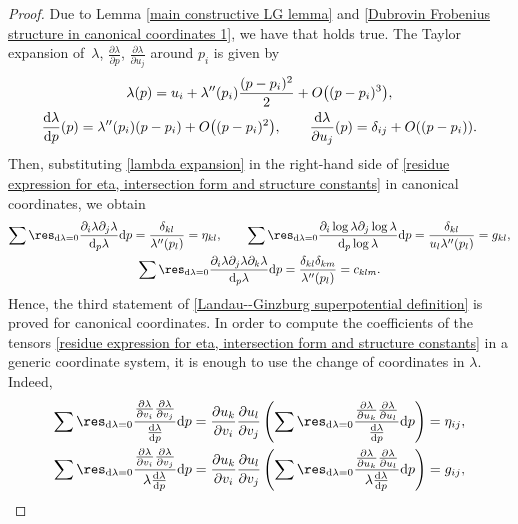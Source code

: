 \begin{proof}
Due to Lemma \ref{main constructive LG lemma} and \eqref{Dubrovin Frobenius structure in canonical coordinates 1}, we have that
holds true. The Taylor expansion of~$\lambda$, $\frac{\partial \lambda}{\partial p}$, $\frac{\partial \lambda}{\partial u_j}$ around $p_i$ is given by
\begin{gather}
\lambda(p)=u_i+\lambda^{\prime\prime}(p_i)\frac{(p-p_i)^2}{2}+O\bigl( (p-p_i)^3\bigr),\nonumber\\
\frac{{\rm d} \lambda}{{\rm d}p}(p)=\lambda^{\prime\prime}(p_i)(p-p_i)+O\bigl( (p-p_i)^2\bigr),\qquad
\frac{{\rm d} \lambda}{\partial u_j}(p)=\delta_{ij}+O( (p-p_i)).\label{lambda expansion}
\end{gather}
Then, substituting \eqref{lambda expansion} in the right-hand side of \eqref{residue expression for eta, intersection form and structure constants} in canonical coordinates, we obtain
\begin{gather*}%
 \sum \res_{{\rm d}\lambda=0} \frac{ \partial_i\lambda \partial_j\lambda }{{\rm d}_p\lambda }{\rm d}p =\frac{\delta_{kl}}{\lambda^{\prime\prime}(p_l)}=\eta_{kl},\qquad
\sum \res_{{\rm d}\lambda=0} \frac{ \partial_i\log\lambda \partial_j\log\lambda }{{\rm d}_p\log\lambda} {\rm d}p =\frac{\delta_{kl}}{u_l\lambda^{\prime\prime}(p_l)}=g_{kl},\\
\sum \res_{{\rm d}\lambda=0} \frac{ \partial_i\lambda \partial_j\lambda \partial_k\lambda }{{\rm d}_p\lambda}{\rm d}p=\frac{\delta_{kl}\delta_{km}}{\lambda^{\prime\prime}(p_l)}=c_{klm}.
\end{gather*}
Hence, the third statement of \ref{Landau--Ginzburg superpotential definition} is proved for canonical coordinates. In order to compute the coefficients of the tensors \eqref{residue expression for eta, intersection form and structure constants} in a generic coordinate system, it is enough to use the change of coordinates in $\lambda$. Indeed,
\begin{gather*}%
\sum \res_{{\rm d}\lambda=0} \frac{\frac{\partial\lambda}{\partial v_i}\frac{\partial\lambda}{\partial v_j} }{\frac{{\rm d}\lambda}{{\rm d}p} }{\rm d}p=\frac{\partial u_k}{\partial v_i}\frac{\partial u_l}{\partial v_j}\left(\sum \res_{{\rm d}\lambda=0} \frac{\frac{\partial\lambda}{\partial u_k}\frac{\partial\lambda}{\partial u_l} }{\frac{{\rm d}\lambda}{{\rm d}p} }{\rm d}p \right)=\eta_{ij},\\
\sum \res_{{\rm d}\lambda=0} \frac{\frac{\partial\lambda}{\partial v_i}\frac{\partial\lambda}{\partial v_j} }{\lambda\frac{{\rm d}\lambda}{{\rm d}p} }{\rm d}p=\frac{\partial u_k}{\partial v_i}\frac{\partial u_l}{\partial v_j}\left(\sum \res_{{\rm d}\lambda=0} \frac{\frac{\partial\lambda}{\partial u_k}\frac{\partial\lambda}{\partial u_l} }{\lambda \frac{{\rm d}\lambda}{{\rm d}p} }{\rm d}p\right)=g_{ij} ,\\

\end{gather*}
\end{proof}
